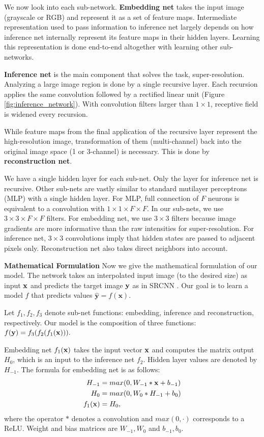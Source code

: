 \documentclass[10pt,twocolumn,letterpaper]{article}
\begin{document}
We now look into each sub-network. \textbf{Embedding net} takes the input image (grayscale or RGB) and represent it as a set of feature maps. Intermediate representation used to pass information to inference net largely depends on how inference net internally represent its feature maps in their hidden layers. Learning this representation is done end-to-end altogether with learning other sub-networks.


\textbf{Inference net} is the main component that solves the task, super-resolution. Analyzing a large image region is done by a single recursive layer. Each recursion applies the same convolution followed by a rectified linear unit (Figure \ref{fig:inference_network}). With convolution filters larger than $1\times 1$,  receptive field is widened every recursion.   

While feature maps from the final application of the recursive layer represent the high-resolution image, transformation of them (multi-channel) back into the original image space (1 or 3-channel) is necessary. This is done by \textbf{reconstruction net}.  

We have a single hidden layer for each sub-net. Only the layer for inference net is recursive. Other sub-nets are vastly similar to standard mutilayer perceptrons (MLP) with a single hidden layer. For MLP, full connection of $F$ neurons is equivalent to a convolution with $1\times 1\times F \times F$. In our sub-nets, we use $3\times 3\times F \times F$ filters. For embedding net, we use $3\times 3$ filters because image gradients are more informative than the raw intensities for super-resolution. For inference net, $3\times 3$ convolutions imply that hidden states are passed to adjacent pixels only. Reconstruction net also takes direct neighbors into account.

\textbf{Mathematical Formulation} Now we give the mathematical formulation of our model. The network takes an interpolated input image (to the desired size) as input ${\bf x}$ and predicts the target image ${\bf y}$ as in SRCNN \cite{dong2014image}. Our goal is to learn a model $f$ that predicts values $\mathbf{\hat{y}}=f(\mathbf{x})$.  

 Let $f_1, f_2, f_3$ denote sub-net functions: embedding, inference and reconstruction, respectively. Our model is the composition of three functions: $f({\bf y}) = f_3(f_2 (f_1({\bf x}))).$
 
 Embedding net $f_1({\bf x})$ takes the input vector ${\bf x}$ and computes the matrix output $H_0$, which is an input to the inference net $f_2$. Hidden layer values are denoted by $H_{-1}$. The formula for embedding net is as follows:
  \begin{align}
        H_{-1} &= max(0, W_{-1}*{\bf x} + b_{-1})\\
        H_0 &= max(0, W_{0}*H_{-1} + b_0)\\
        f_1({\bf x}) &= H_0,
    \end{align}
where the operator $*$ denotes a convolution and $max(0,\cdot)$ corresponds to a ReLU. Weight and bias matrices are $W_{-1},W_0$ and $b_{-1},b_0$.
\end{document}

